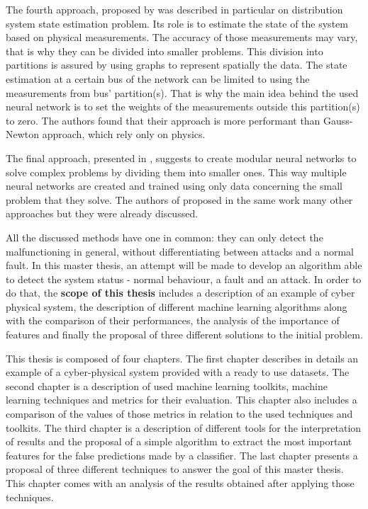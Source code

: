 The fourth approach, proposed by \cite{zamzam_physics-aware_2019} was described in particular on distribution system state estimation problem. Its role is to estimate the state of the system based on physical measurements. The accuracy of those measurements may vary, that is why they can be divided into smaller problems. This division into partitions is assured by using graphs to represent spatially the data.  The state estimation at a certain bus of the network can be limited to using the measurements from bus' partition(s). That is why the main idea behind the used neural network is to set the weights of the measurements outside this partition(s) to zero. The authors found that their approach is more performant than Gauss-Newton approach, which rely only on physics.

The final approach, presented in \cite{karpatne_theory-guided_2017}, suggests to create modular neural networks to solve complex problems by dividing them into smaller ones. This way multiple neural networks are created and trained using only data concerning the small problem that they solve. The authors of \cite{karpatne_theory-guided_2017} proposed in the same work many other approaches but they were already discussed.

All the discussed methods have one in common: they can only detect the malfunctioning in general, without differentiating between attacks and a normal fault. In this master thesis, an attempt will be made to develop an algorithm able to detect the system status - normal behaviour, a fault and an attack. In order to do that, the \textbf{scope of this thesis} includes a description of an example of cyber physical system, the description of different machine learning algorithms along with the comparison of their performances, the analysis of the importance of features and finally the proposal of three different solutions to the initial problem.

This thesis is composed of four chapters. The first chapter describes in details an example of a cyber-physical system provided with a ready to use datasets. The second chapter is a description of used machine learning toolkits, machine learning techniques and metrics for their evaluation. This chapter also includes a comparison of the values of those metrics in relation to the used techniques and toolkits. The third chapter is a description of different tools for the interpretation of results and the proposal of a simple algorithm to extract the most important features for the false predictions made by a classifier. The last chapter presents a proposal of three different techniques to answer the goal of this master thesis. This chapter comes with an analysis of the results obtained after applying those techniques. 